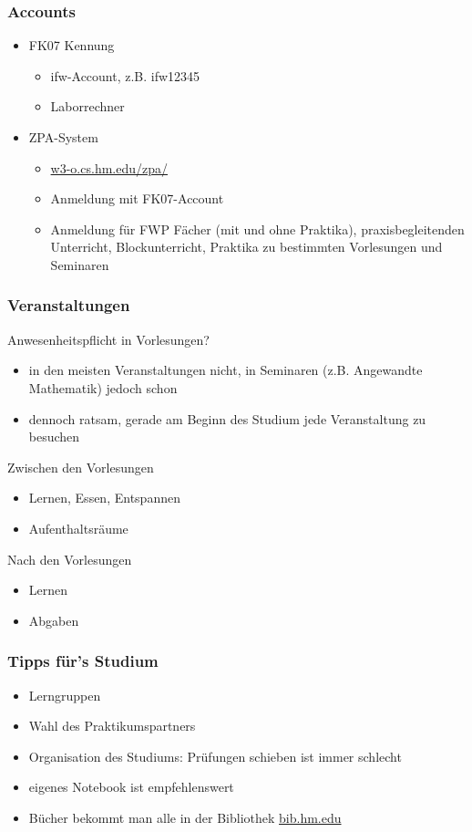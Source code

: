 \documentclass{beamer}
\begin{document}
	\begin{frame}[t]
		\frametitle{Accounts}
		\begin{itemize}
			\item FK07 Kennung
			\begin{itemize}
				\item ifw-Account, z.B. ifw12345
				\item Laborrechner
			\end{itemize}
			\pause
			\item ZPA-System
			\begin{itemize}
				\item \url{w3-o.cs.hm.edu/zpa/}
				\item Anmeldung mit FK07-Account
				\item Anmeldung  für FWP Fächer (mit und ohne Praktika),
				praxisbegleitenden Unterricht,
				Blockunterricht,
				Praktika zu bestimmten Vorlesungen und
				Seminaren
			\end{itemize}
		\end{itemize}
	\end{frame}
	
	\begin{frame}
		\frametitle{Veranstaltungen}
		Anwesenheitspflicht in Vorlesungen?
		\begin{itemize}
			\item in den meisten Veranstaltungen nicht, in Seminaren (z.B. Angewandte Mathematik) jedoch schon
			\item dennoch ratsam, gerade am Beginn des Studium jede Veranstaltung zu besuchen
		\end{itemize}
		\bigskip
		\pause
		Zwischen den Vorlesungen
		\begin{itemize}
			\item Lernen, Essen, Entspannen
			\item Aufenthaltsräume
		\end{itemize}
		\bigskip
		\pause
		Nach den Vorlesungen
		\begin{itemize}
			\item Lernen
			\item Abgaben
		\end{itemize}
		
	\end{frame}
	
	\begin{frame}[t]
		\frametitle{Tipps für's Studium}
		\begin{itemize}
			\item Lerngruppen
			\pause
			\item Wahl des Praktikumspartners
			\pause
			\item Organisation des Studiums: Prüfungen schieben ist immer schlecht
			\pause
			\item eigenes Notebook ist empfehlenswert
			\pause
			\item Bücher bekommt man alle in der Bibliothek \url{bib.hm.edu}
		\end{itemize}
	\end{frame}
	
\end{document}
